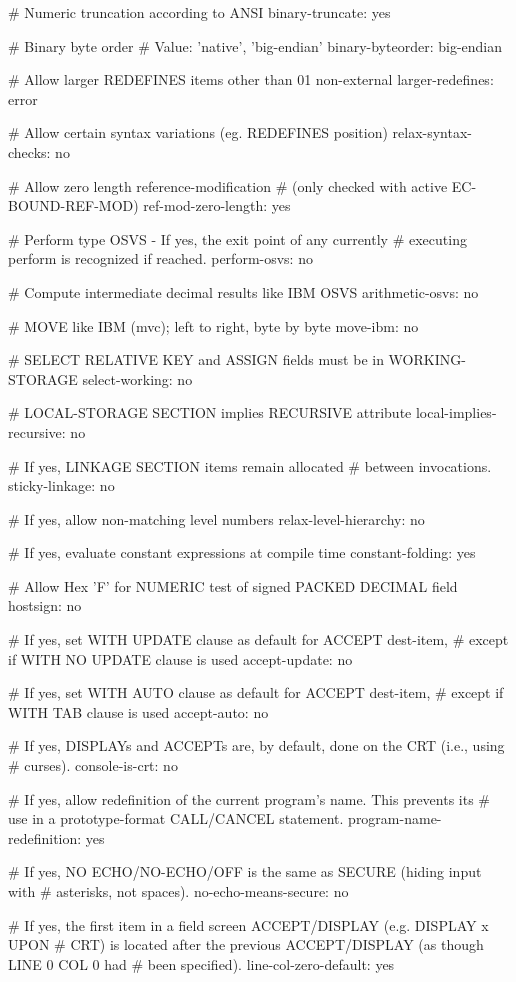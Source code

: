 # Numeric truncation according to ANSI
binary-truncate:		yes

# Binary byte order
# Value: 'native', 'big-endian'
binary-byteorder:		big-endian

# Allow larger REDEFINES items other than 01 non-external
larger-redefines:		error

# Allow certain syntax variations (eg. REDEFINES position)
relax-syntax-checks:		no

# Allow zero length reference-modification
# (only checked with active EC-BOUND-REF-MOD)
ref-mod-zero-length:		yes

# Perform type OSVS - If yes, the exit point of any currently
# executing perform is recognized if reached.
perform-osvs:			no

# Compute intermediate decimal results like IBM OSVS
arithmetic-osvs:		no

# MOVE like IBM (mvc); left to right, byte by byte
move-ibm:			no

# SELECT RELATIVE KEY and ASSIGN fields must be in WORKING-STORAGE
select-working:		no

# LOCAL-STORAGE SECTION implies RECURSIVE attribute
local-implies-recursive:		no

# If yes, LINKAGE SECTION items remain allocated
# between invocations.
sticky-linkage:			no

# If yes, allow non-matching level numbers
relax-level-hierarchy:		no

# If yes, evaluate constant expressions at compile time
constant-folding:		yes

# Allow Hex 'F' for NUMERIC test of signed PACKED DECIMAL field
hostsign:			no

# If yes, set WITH UPDATE clause as default for ACCEPT dest-item,
# except if WITH NO UPDATE clause is used
accept-update:			no

# If yes, set WITH AUTO clause as default for ACCEPT dest-item,
# except if WITH TAB clause is used
accept-auto:			no

# If yes, DISPLAYs and ACCEPTs are, by default, done on the CRT (i.e., using
# curses).
console-is-crt:			no

# If yes, allow redefinition of the current program's name. This prevents its
# use in a prototype-format CALL/CANCEL statement.
program-name-redefinition:	yes

# If yes, NO ECHO/NO-ECHO/OFF is the same as SECURE (hiding input with
# asterisks, not spaces).
no-echo-means-secure:		no

# If yes, the first item in a field screen ACCEPT/DISPLAY (e.g. DISPLAY x UPON
# CRT) is located after the previous ACCEPT/DISPLAY (as though LINE 0 COL 0 had
# been specified).
line-col-zero-default:		yes

